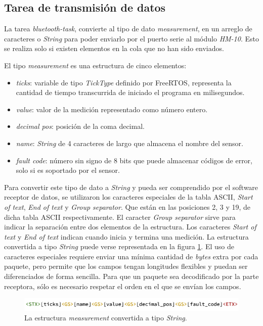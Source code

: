 \subsection{Tarea de transmisión de datos}

La tarea \textit{bluetooth-task}, convierte al tipo de dato \textit{measurement}, en un arreglo de caracteres o \textit{String} para poder enviarlo por el puerto serie al módulo \textit{HM-10}. Esto se realiza solo si existen elementos en la cola que no han sido enviados.

El tipo \textit{measurement} es una estructura de cinco elementos:

\begin{itemize}
\item{\textit{ticks}:} variable de tipo \textit{TickType} definido por FreeRTOS, representa la cantidad de tiempo transcurrida de iniciado el programa en milisegundos.
\item{\textit{value}:} valor de la medición representado como número entero.
\item{\textit{decimal pos}:} posición de la coma decimal.
\item{\textit{name}:} \textit{String} de 4 caracteres de largo que almacena el nombre del sensor.
\item{\textit{fault code}:} número sin signo de 8 bits que puede almacenar códigos de error, solo si es soportado por el sensor.
\end{itemize}

Para convertir este tipo de dato a \textit{String} y pueda ser comprendido por el software receptor de datos, se utilizaron los caracteres especiales de la tabla ASCII, \textit{Start of text}, \textit{End of text} y \textit{Group separator}. Que están en las posiciones 2, 3 y 19, de dicha tabla ASCII respectivamente. El caracter \textit{Group separator} sirve para indicar la separación entre dos elementos de la estructura. Los caracteres \textit{Start of text} y \textit{End of text} indican cuando inicia y termina una medición. La estructura convertida a tipo \textit{String} puede verse representada en la figura \ref{fig:measurement-string}. El uso de caracteres especiales requiere enviar una mínima cantidad de \textit{bytes} extra por cada paquete, pero permite que los campos tengan longitudes flexibles y puedan ser diferenciados de forma sencilla. Para que un paquete sea decodificado por la parte receptora, sólo es necesario respetar el orden en el que se envían los campos.

\begin{figure}[htpb]
\centering
\includegraphics[width=.9\textwidth]{./Figures/measurement-string.png}
\caption{La estructura \textit{measurement} convertida a tipo \textit{String}.}
\label{fig:measurement-string}
\end{figure}


